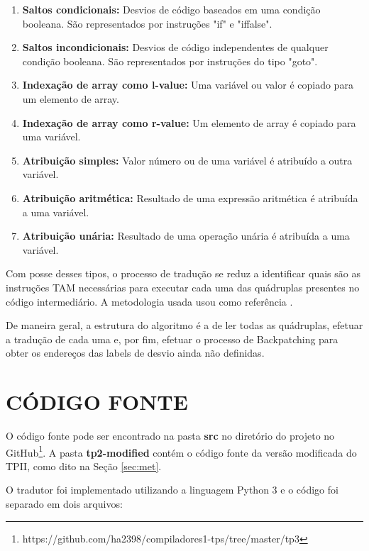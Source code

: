 \documentclass[12pt]{article}
\begin{document}
\begin{enumerate}
 \item \textbf{Saltos condicionais:} Desvios de código baseados em uma condição booleana. São representados por
 instruções "if" e "iffalse".
 
 \item \textbf{Saltos incondicionais:} Desvios de código independentes de qualquer condição booleana. São representados
 por instruções do tipo "goto".
 
 \item \textbf{Indexação de array como l-value:} Uma variável ou valor é copiado para um elemento de array.
 
 \item \textbf{Indexação de array como r-value:} Um elemento de array é copiado para uma variável.
 
 \item \textbf{Atribuição simples:} Valor número ou de uma variável é atribuído a outra variável.
 
 \item \textbf{Atribuição aritmética:} Resultado de uma expressão aritmética é atribuída a uma variável.
 
 \item \textbf{Atribuição unária:} Resultado de uma operação unária é atribuída a uma variável.
\end{enumerate}

Com posse desses tipos, o processo de tradução se reduz a identificar quais são as instruções TAM necessárias 
para executar cada uma das quádruplas presentes no código intermediário. A metodologia usada usou como referência
\cite{Aho:86}.

De maneira geral, a estrutura do algoritmo é a de ler todas as quádruplas, efetuar a tradução de cada uma e, por fim, 
efetuar o processo de Backpatching para obter os endereços das labels de desvio ainda não definidas.

\section{CÓDIGO FONTE}

O código fonte pode ser encontrado na pasta \textbf{src} no diretório do projeto no
GitHub\footnote{https://github.com/ha2398/compiladores1-tps/tree/master/tp3}. A pasta \textbf{tp2-modified} contém
o código fonte da versão modificada do TPII, como dito na Seção \ref{sec:met}.

O tradutor foi implementado utilizando a linguagem Python 3 e o código foi separado em dois arquivos:
\end{document}
